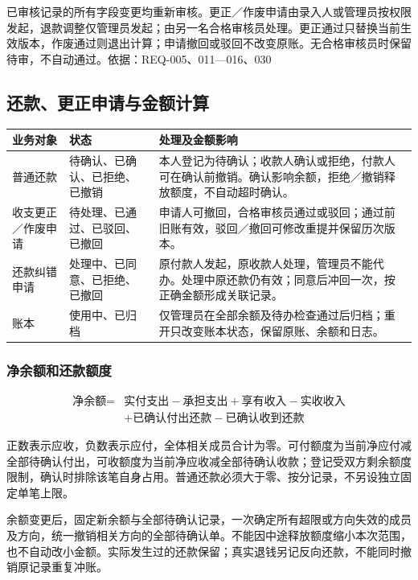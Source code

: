 \documentclass[UTF8,a4paper,11pt,fontset=fandol]{ctexart}
\renewcommand{\arraystretch}{1.3}
\newcommand{\smalltable}{\small\setlength{\tabcolsep}{5pt}\renewcommand{\arraystretch}{1.25}}
\begin{document}
已审核记录的所有字段变更均重新审核。更正／作废申请由录入人或管理员按权限发起，退款调整仅管理员发起；由另一名合格审核员处理。更正通过只替换当前生效版本，作废通过则退出计算；申请撤回或驳回不改变原账。无合格审核员时保留待审，不自动通过。\hfill{\small\color{muted}依据：REQ-005、011—016、030}

\newpage
\subsection{还款、更正申请与金额计算}
\begin{center}\smalltable
\begin{tabularx}{\linewidth}{p{23mm}p{45mm}Y}
\toprule
{}业务对象 & 状态 & 处理及金额影响\\
\midrule
普通还款 & 待确认、已确认、已拒绝、已撤销 & 本人登记为待确认；收款人确认或拒绝，付款人可在确认前撤销。确认影响余额，拒绝／撤销释放额度，不自动超时确认。\\
收支更正／作废申请 & 待处理、已通过、已驳回、已撤回 & 申请人可撤回，合格审核员通过或驳回；通过前旧账有效，驳回／撤回可修改重提并保留历次版本。\\
还款纠错申请 & 处理中、已同意、已拒绝、已撤回 & 原付款人发起，原收款人处理，管理员不能代办。处理中原还款仍有效；同意后冲回一次，按正确金额形成关联记录。\\
账本 & 使用中、已归档 & 仅管理员在全部余额及待办检查通过后归档；重开只改变账本状态，保留原账、余额和日志。\\
\bottomrule
\end{tabularx}
\end{center}

\subsubsection{净余额和还款额度}
\begin{align*}
\text{净余额}={}&\text{实付支出}-\text{承担支出}+\text{享有收入}-\text{实收收入}\\
&+\text{已确认付出还款}-\text{已确认收到还款}
\end{align*}

正数表示应收，负数表示应付，全体相关成员合计为零。可付额度为当前净应付减全部待确认付出，可收额度为当前净应收减全部待确认收款；登记受双方剩余额度限制，确认时排除该笔自身占用。普通还款必须大于零、按分记录，不另设独立固定单笔上限。

余额变更后，固定新余额与全部待确认记录，一次确定所有超限或方向失效的成员及方向，统一撤销相关方向的全部待确认单。不能因中途释放额度缩小本次范围，也不自动改小金额。实际发生过的还款保留；真实退钱另记反向还款，不能同时撤销原记录重复冲账。
\end{document}

